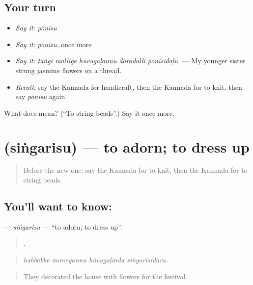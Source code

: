 \subsection*{Your turn}
\begin{itemize}
\raggedright
  \item \emph{Say it:} \emph{pōṇisu}
  \item \emph{Say it:} \emph{pōṇisu}, once more
  \item \emph{Say it:} \emph{taṅgi mallige hūvugaḷannu dāradalli pōṇisidaḷu.} — My younger sister strung jasmine flowers on a thread.
  \item \emph{Recall:} say the Kannada for handicraft, then the Kannada for to knit, then say \emph{pōṇisu} again
\end{itemize}

\begin{tcolorbox}[breakable,colback=teal!4,colframe=teal!35!black,title={Before you move on}]
What does  mean? (\textquotedblleft{}To string beads\textquotedblright{}.) Say it once more.
\end{tcolorbox}
\section[\texorpdfstring{\kn{ಸಿಂಗರಿಸು} (siṅgarisu)}{ಸಿಂಗರಿಸು (siṅgarisu)}]{ (siṅgarisu) — to adorn; to dress up}

\label{lesson:KA-C533-singarisu}



\begin{quote}
Before the new one: say the Kannada for to knit, then the Kannada for to string beads.
\end{quote}

\subsection*{You'll want to know: }
\textbf{} — \emph{siṅgarisu} — \textquotedblleft{}to adorn; to dress up\textquotedblright{}.

\begin{quote}
   .
\end{quote}

\begin{quote}
\emph{habbakke maneyannu hūvugaḷinda siṅgarisidaru.}
\end{quote}

\begin{quote}
They decorated the house with flowers for the festival.
\end{quote}

